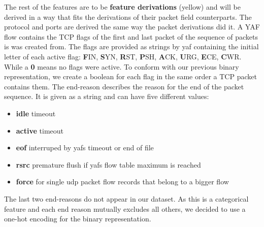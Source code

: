 \documentclass[
	ngerman,
	ruledheaders=section,%
	class=report,%
	thesis={type=bachelor},%
	accentcolor=9c,%
	custommargins=true,%
	marginpar=false,%
	parskip=half-,%
	fontsize=11pt,%
]{tudapub}
\begin{document}
The rest of the features are to be \colorbox{derivation}{\textbf{feature derivations} (yellow)} and will be derived in a way that fits the derivations of their packet field counterparts.
The protocol and ports are derived the same way the packet derivations did it.
A YAF flow contains the TCP flags of the first and last packet of the sequence of packets is was created from.
The flags are provided as strings by yaf containing the initial letter of each active flag:
\textbf{F}IN, \textbf{S}YN, \textbf{R}ST, \textbf{P}SH, \textbf{A}CK, \textbf{U}RG, \textbf{E}CE, \textbf{C}WR.
While a \textbf{0} means no flags were active.
To conform with our previous binary representation, we create a boolean for each flag in the same order a TCP packet contains them.
The end-reason describes the reason for the end of the packet sequence.
It is given as a string and can have five different values:
\begin{itemize}
    \item \textbf{idle} timeout
    \item \textbf{active} timeout
    \item \textbf{eof} interruped by yafs timeout or end of file
    \item \textbf{rsrc} premature flush if yafs flow table maximum is reached
    \item \textbf{force} for single udp packet flow records that belong to a bigger flow
\end{itemize}
The last two end-reasons do not appear in our dataset.
As this is a categorical feature and each end reason mutually excludes all others, we decided to use a one-hot encoding for the binary representation.



\end{document}
